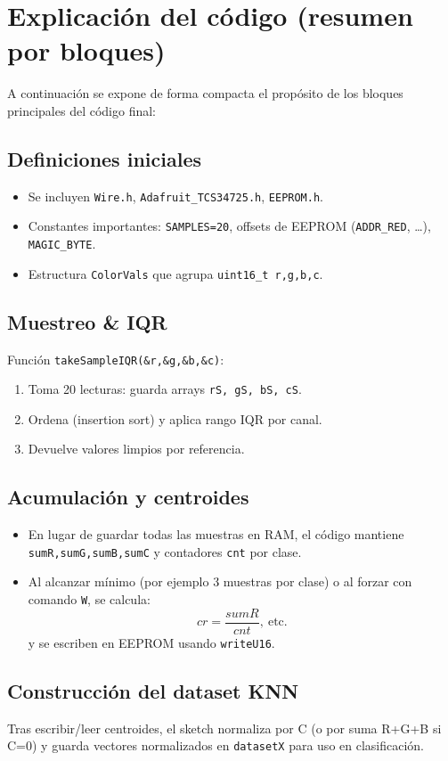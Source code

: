 \documentclass[conference]{IEEEtran}
\begin{document}
\section{Explicación del código (resumen por bloques)}
A continuación se expone de forma compacta el propósito de los bloques principales del código final:

\subsection{Definiciones iniciales}
\begin{itemize}
  \item Se incluyen \texttt{Wire.h}, \texttt{Adafruit\_TCS34725.h}, \texttt{EEPROM.h}.
  \item Constantes importantes: \texttt{SAMPLES=20}, offsets de EEPROM (\texttt{ADDR\_RED}, \dots), \texttt{MAGIC\_BYTE}.
  \item Estructura \texttt{ColorVals} que agrupa \texttt{uint16\_t r,g,b,c}.
\end{itemize}

\subsection{Muestreo \& IQR}
Función \texttt{takeSampleIQR(\&r,\&g,\&b,\&c)}:
\begin{enumerate}
  \item Toma 20 lecturas: guarda arrays \texttt{rS, gS, bS, cS}.
  \item Ordena (insertion sort) y aplica rango IQR por canal.
  \item Devuelve valores limpios por referencia.
\end{enumerate}

\subsection{Acumulación y centroides}
\begin{itemize}
  \item En lugar de guardar todas las muestras en RAM, el código mantiene \texttt{sumR,sumG,sumB,sumC} y contadores \texttt{cnt} por clase.
  \item Al alcanzar mínimo (por ejemplo 3 muestras por clase) o al forzar con comando \texttt{W}, se calcula:
  \[
  cr = \frac{sumR}{cnt}, \ \text{etc.}
  \]
  y se escriben en EEPROM usando \texttt{writeU16}.
\end{itemize}

\subsection{Construcción del dataset KNN}
Tras escribir/leer centroides, el sketch normaliza por C (o por suma R+G+B si C=0) y guarda vectores normalizados en \texttt{datasetX} para uso en clasificación.
\end{document}

